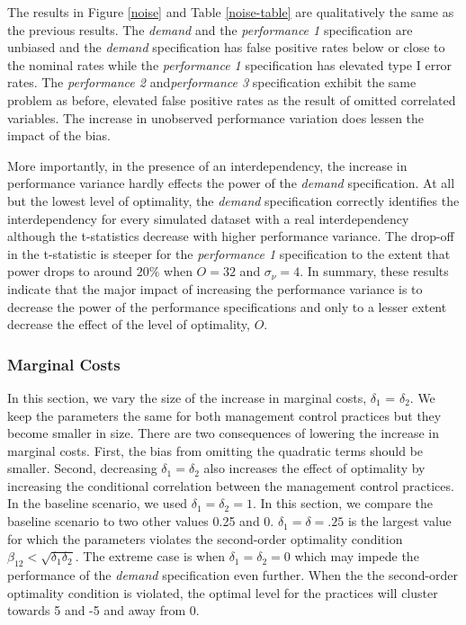 \documentclass[12pt]{article}
\begin{document}


The results in Figure \ref{noise} and Table \ref{noise-table} are qualitatively the same as the previous results. The \emph{demand} and the \emph{performance 1} specification are unbiased and the \emph{demand} specification has false positive rates below or close to the nominal rates while the \emph{performance 1} specification has elevated type I error rates. The \emph{performance 2} and\emph{performance 3} specification exhibit the same problem as before, elevated false positive rates as the result of omitted correlated variables. The increase in unobserved performance variation does lessen the impact of the bias.

More importantly, in the presence of an interdependency, the increase in performance variance hardly effects the power of the \emph{demand} specification. At all but the lowest level of optimality, the \emph{demand} specification correctly identifies the interdependency for every simulated dataset with a real interdependency although the t-statistics decrease with higher performance variance. The drop-off in the t-statistic is steeper for the \emph{performance 1} specification to the extent that power drops to around \(20\%\) when \(O = 32\) and \(\sigma_{\nu} = 4\). In summary, these results indicate that the major impact of increasing the performance variance is to decrease the power of the performance specifications and only to a lesser extent decrease the effect of the level of optimality, $O$.

\subsubsection{Marginal Costs}\label{marginal-cost}
 
In this section, we vary the size of the increase in marginal costs, \(\delta_1\) = \(\delta_2\). We keep the parameters the same for both management control practices but they become smaller in size. There are two consequences of lowering the increase in marginal costs. First, the bias from omitting the quadratic terms should be smaller. Second, decreasing \(\delta_1 = \delta_2\) also increases the effect of optimality by increasing the conditional correlation between the management control practices.  In the baseline scenario, we used \(\delta_1 = \delta_2 = 1\). In this section, we compare the baseline scenario to two other values 0.25 and 0. \(\delta_1 = \delta = .25\) is the largest value for which the parameters violates the second-order optimality condition \(\beta_{12} < \sqrt{\delta_1 \delta_2}\). The extreme case is when \(\delta_1 = \delta_2 = 0\) which may impede the performance of the \emph{demand} specification even further. When the the second-order optimality condition is violated, the optimal level for the practices will cluster towards 5 and -5 and away from  0. 
\end{document}

